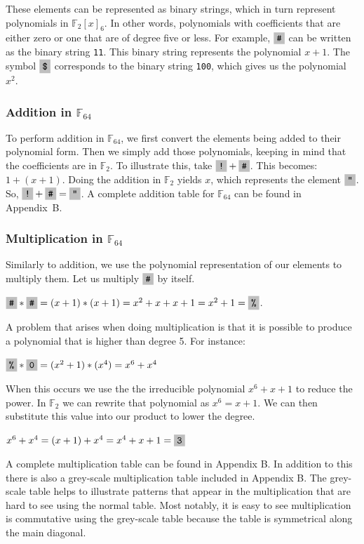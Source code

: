 \documentclass{article}
\begin{document}
These elements can be represented as binary strings, which in turn represent polynomials in $\mathbb{F}_2[x]_{6}$. In other words, polynomials with coefficients that are either zero or one that are of degree five or less. For example, $\f{\#}$ can be written as the binary string \texttt{11}. This binary string represents the polynomial $x + 1$. The symbol $\f{\$}$ corresponds to the binary string \texttt{100}, which gives us the polynomial $x^2$.

\subsubsection{Addition in $\mathbb{F}_{64}$}
To perform addition in $\mathbb{F}_{64}$, we first convert the elements being added to their polynomial form. Then we simply add those polynomials, keeping in mind that the coefficients are in $\mathbb{F}_2$. To illustrate this, take $\f{!} + \f{\#}$. This becomes: $1 + (x + 1)$. Doing the addition in $\mathbb{F}_2$ yields $x$, which represents the element $\f{"}$. So, $\f{!} + \f{\#} = \f{"}$. A complete addition table for $\mathbb{F}_{64}$ can be found in Appendix~B.

\subsubsection{Multiplication in $\mathbb{F}_{64}$}
Similarly to addition, we use the polynomial representation of our elements to multiply them. Let us multiply $\f{\#}$ by itself. 
\begin{center}
$\f{\#} * \f{\#} = (x + 1) * (x + 1) = x^2 + x + x + 1 = x^2 + 1 = \f{\%}$.
\end{center}

A problem that arises when doing multiplication is that it is possible to produce a polynomial that is higher than degree 5. For instance:
\begin{center}
$\f{\%} * \f{0} = (x^2 + 1) * (x^4) = x^6 + x^4$
\end{center}

When this occurs we use the the irreducible polynomial $x^6 + x + 1$ to reduce the power. In $\mathbb{F}_2$ we can rewrite that polynomial as $x^6 = x + 1$. We can then substitute this value into our product to lower the degree.
\begin{center}
$x^6 + x^4 = (x+1) + x^4 = x^4 + x + 1 = \f{3}$
\end{center}

A complete multiplication table can be found in Appendix B. In addition to this there is also a grey-scale multiplication table included in Appendix B. The grey-scale table helps to illustrate patterns that appear in the multiplication that are hard to see using the normal table. Most notably, it is easy to see multiplication is commutative using the grey-scale table because the table is symmetrical along the main diagonal.
\end{document}
